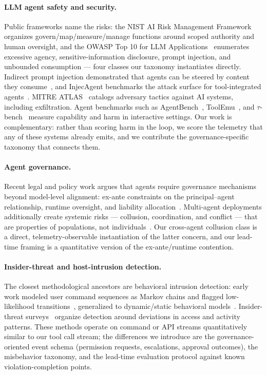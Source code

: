 \documentclass[10pt]{article}
\begin{document}
\paragraph{LLM agent safety and security.}
Public frameworks name the risks: the NIST AI Risk Management
Framework~\cite{nistairmf} organizes govern/map/measure/manage functions
around scoped authority and human oversight, and the OWASP Top 10 for LLM
Applications~\cite{owasp} enumerates excessive agency, sensitive-information
disclosure, prompt injection, and unbounded consumption --- four classes our
taxonomy instantiates directly. Indirect prompt injection demonstrated that
agents can be steered by content they consume~\cite{greshake2023}, and
InjecAgent benchmarks the attack surface for tool-integrated
agents~\cite{injecagent}. MITRE ATLAS~\cite{atlas} catalogs adversary tactics
against AI systems, including exfiltration. Agent benchmarks such as
AgentBench~\cite{agentbench}, ToolEmu~\cite{toolemu}, and
$\tau$-bench~\cite{taubench} measure capability and harm in interactive
settings. Our work is complementary: rather than scoring harm in the loop, we
score the telemetry that any of these systems already emits, and we contribute
the governance-specific taxonomy that connects them.

\paragraph{Agent governance.}
Recent legal and policy work argues that agents require governance mechanisms
beyond model-level alignment: ex-ante constraints on the principal--agent
relationship, runtime oversight, and liability allocation~\cite{kolt2025}.
Multi-agent deployments additionally create systemic risks --- collusion,
coordination, and conflict --- that are properties of populations, not
individuals~\cite{multiagent2025}. Our cross-agent collusion class is a direct,
telemetry-observable instantiation of the latter concern, and our
lead-time framing is a quantitative version of the ex-ante/runtime contention.

\paragraph{Insider-threat and host-intrusion detection.}
The closest methodological ancestors are behavioral intrusion detection: early
work modeled user command sequences as Markov chains and flagged
low-likelihood transitions~\cite{yemarkov}, generalized to dynamic/static
behavioral models~\cite{yeung2003}. Insider-threat surveys~\cite{homoliak2019}
organize detection around deviations in access and activity patterns. These
methods operate on command or API streams quantitatively similar to our tool
call stream; the differences we introduce are the governance-oriented event
schema (permission requests, escalations, approval outcomes), the misbehavior
taxonomy, and the lead-time evaluation protocol against known
violation-completion points.
\end{document}
